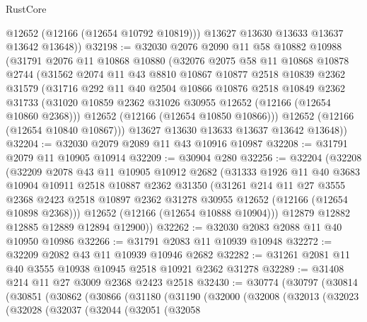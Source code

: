 \begin{lexlean}{RustCore}
\begin{coremodule}
          @12652
          (@12166 (@12654 @10792 @10819)))
        @13627
        @13630
        @13633
        @13637
        @13642
        @13648))
@32198 := @32030
    @2076
    @2090
    @11
    @58
    @10882
    @10988
    (@31791
      @2076
      @11
      @10868
      @10880
      (@32076
        @2075
        @58
        @11
        @10868
        @10878
        @2744
        (@31562
          @2074
          @11
          @43
          @8810
          @10867
          @10877
          @2518
          @10839
          @2362
          @31579
          (@31716
            @292
            @11
            @40
            @2504
            @10866
            @10876
            @2518
            @10849
            @2362
            @31733
            (@31020 @10859 @2362 @31026 @30955 @12652 (@12166 (@12654 @10860 @2368)))
            @12652
            (@12166 (@12654 @10850 @10866)))
          @12652
          (@12166 (@12654 @10840 @10867)))
        @13627
        @13630
        @13633
        @13637
        @13642
        @13648))
@32204 := @32030 @2079 @2089 @11 @43 @10916 @10987
@32208 := @31791 @2079 @11 @10905 @10914
@32209 := @30904 @280
@32256 := @32204
    (@32208
      (@32209
        @2078
        @43
        @11
        @10905
        @10912
        @2682
        (@31333
          @1926
          @11
          @40
          @3683
          @10904
          @10911
          @2518
          @10887
          @2362
          @31350
          (@31261
            @214
            @11
            @27
            @3555
            @2368
            @2423
            @2518
            @10897
            @2362
            @31278
            @30955
            @12652
            (@12166 (@12654 @10898 @2368)))
          @12652
          (@12166 (@12654 @10888 @10904)))
        @12879
        @12882
        @12885
        @12889
        @12894
        @12900))
@32262 := @32030 @2083 @2088 @11 @40 @10950 @10986
@32266 := @31791 @2083 @11 @10939 @10948
@32272 := @32209 @2082 @43 @11 @10939 @10946 @2682
@32282 := @31261 @2081 @11 @40 @3555 @10938 @10945 @2518 @10921 @2362 @31278
@32289 := @31408 @214 @11 @27 @3009 @2368 @2423 @2518
@32430 := @30774
    (@30797
      (@30814
        (@30851
          (@30862
            (@30866
              (@31180
                (@31190
                  (@32000
                    (@32008
                      (@32013
                        (@32023
                          (@32028
                            (@32037
                              (@32044
                                (@32051
                                  (@32058

\end{coremodule}
\end{lexlean}
